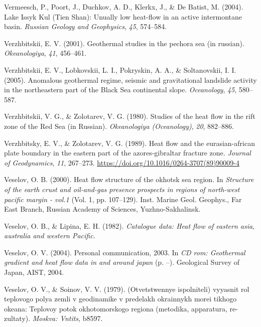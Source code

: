 \begin{CSLReferences}{1}{1}
\leavevmode{}%
Vermeesch, P., Poort, J., Duchkov, A. D., Klerkx, J., \& De Batist, M. (2004). {Lake Issyk Kul (Tien Shan)}: Unually low heat-flow in an active intermontane basin. \emph{Russian Geology and Geophysics}, \emph{45}, 574--584.

\leavevmode{}%
Verzhbitskii, E. V. (2001). Geothermal studies in the pechora sea (in russian). \emph{Okeanologiya}, \emph{41}, 456--461.

\leavevmode{}%
Verzhbitskii, E. V., Lobkovskii, L. I., Pokryskin, A. A., \& Soltanovskii, I. I. (2005). Anomalous geothermal regime, seismic and gravitational landslide activity in the northeastern part of the {Black Sea} continental slope. \emph{Oceanology}, \emph{45}, 580--587.

\leavevmode{}%
Verzhbitskii, V. G., \& Zolotarev, V. G. (1980). Studies of the heat flow in the rift zone of the {Red Sea (in Russian)}. \emph{Okeanologiya (Oceanology)}, \emph{20}, 882--886.

\leavevmode{}%
Verzhbitsky, E. V., \& Zolotarev, V. G. (1989). Heat flow and the eurasian-african plate boundary in the eastern part of the azores-gibraltar fracture zone. \emph{Journal of Geodynamics}, \emph{11}, 267--273. \url{https://doi.org/10.1016/0264-3707(89)90009-4}

\leavevmode{}%
Veselov, O. B. (2000). Heat flow structure of the okhotsk sea region. In \emph{Structure of the earth crust and oil-and-gas presence prospects in regions of north-west pacific margin - vol.1} (Vol. 1, pp. 107--129). Inst. Marine Geol. Geophys., Far East Branch, Russian Academy of Sciences, Yuzhno-Sakhalinsk.

\leavevmode{}%
Veselov, O. B., \& Lipina, E. H. (1982). \emph{Catalogue data: Heat flow of eastern asia, australia and western {Pacific}}.

\leavevmode{}%
Veselov, O. V. (2004). Personal communication, 2003. In \emph{CD rom: Geothermal gradient and heat flow data in and around japan} (p. --). Geological Survey of Japan, AIST, 2004.

\leavevmode{}%
Veselov, O. V., \& Soinov, V. V. (1979). (Otvetstwennye ispolniteli) vyyasnit rol teplovogo polya zemli v geodinamike v predelakh okrainnykh morei tikhogo okeana: Teplovoy potok okhotomorskogo regiona (metodika, apparatura, re- zultaty). \emph{Moskva: Vntits}, b8597.


\end{CSLReferences}
